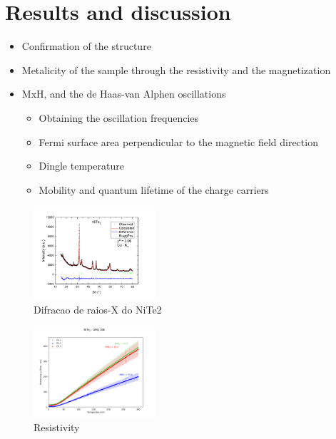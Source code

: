 \documentclass[prd,amsfonts,onecolumn,superscriptaddress,aps,nofootinbib,11pt]{revtex4}
\begin{document}
\section{Results and discussion}\label{sec:resultados}

\begin{itemize}
    \item Confirmation of the structure
    \item Metalicity of the sample through the resistivity and the magnetization
    \item MxH, and the de Haas-van Alphen oscillations
    \begin{itemize}
        \item Obtaining the oscillation frequencies
        \item Fermi surface area perpendicular to the magnetic field direction
        \item Dingle temperature
        \item Mobility and quantum lifetime of the charge carriers
    \end{itemize}
\end{itemize}


\begin{figure}[H]
    \centering
    \includegraphics[width=0.4\textwidth]{results/DRX_GMQ632a.png}
    \caption{Difracao de raios-X do NiTe2}
    \label{fig:drx}
\end{figure}

\begin{figure}[H]
    \centering
    \includegraphics[width=0.4\textwidth]{results/Resistivity.png}
    \caption{Resistivity}
    \label{fig:rho}
\end{figure}
\end{document}
